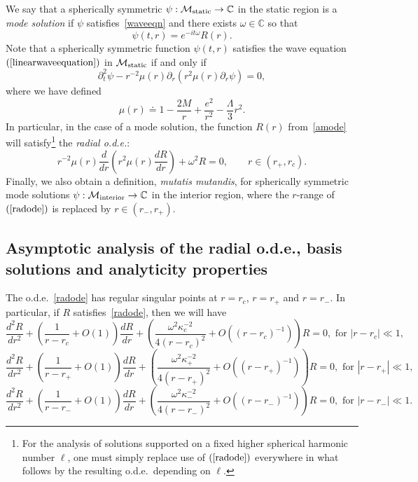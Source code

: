 \documentclass[A4,10pt]{article}
\begin{document}
We say that a spherically symmetric $\psi : \mathcal{M}_{{\rm static}} \to \mathbb{C}$ 
in the static region is a \emph{mode solution} if $\psi$ satisfies~\eqref{waveeqn} and there exists $\omega \in \mathbb{C}$ so that
\begin{equation}\label{amode}
\psi(t,r) = e^{-it\omega}R(r).
\end{equation}
Note that a spherically symmetric function $\psi(t,r)$ satisfies the wave equation $(\ref{linearwaveequation})$ in $\mathcal{M}_{{\rm static}}$ if and only if
\begin{equation}\label{waveeqn}
\partial_t^2\psi - r^{-2}\mu(r)\partial_r\left(r^2\mu(r)\partial_r\psi\right) = 0,
\end{equation}
where we have defined
\[\mu(r) \doteq 1-\frac{2M}{r} + \frac{e^2}{r^2} - \frac{\Lambda}{3}r^2.\]
In particular, in the case of a mode solution, the function $R(r)$ from~\eqref{amode} will satisfy\footnote{For the analysis of solutions supported
on a fixed higher spherical harmonic number $\ell$, 
one must simply replace use of $(\ref{radode})$ everywhere in what follows  by the resulting
o.d.e.~depending on $\ell$.} the \emph{radial o.d.e.}:
\begin{equation}\label{radode}
r^{-2}\mu(r)\frac{d}{dr}\left(r^2\mu(r)\frac{dR}{dr}\right) + \omega^2R = 0,\qquad r \in  (r_+,r_c).
\end{equation}
Finally, we also obtain a definition, \emph{mutatis mutandis}, for spherically symmetric mode solutions $\psi : \mathcal{M}_{{\rm interior}} \to \mathbb{C}$ in the interior region, 
where the $r$-range of $(\ref{radode})$
is replaced by $r\in (r_-,r_+)$. 

\subsection{Asymptotic analysis of the radial o.d.e., basis solutions and analyticity
properties}\label{asympanal}
The o.d.e.~\eqref{radode} has regular singular points at $r = r_c$, $r = r_+$ and $r = r_-$. In particular, if $R$ satisfies~\eqref{radode}, then we will have 
\begin{equation}\label{nearrc}
\frac{d^2R}{dr^2} + \left(\frac{1}{r-r_c} + O\left(1\right)\right)\frac{dR}{dr} + \left(\frac{\omega^2\kappa_c^{-2}}{4(r-r_c)^2} + O\left((r-r_c)^{-1}\right)\right)R = 0,\text{ for }|r-r_c| \ll 1,
\end{equation}
\begin{equation}\label{nearrplus}
\frac{d^2R}{dr^2} + \left(\frac{1}{r-r_+} + O\left(1\right)\right)\frac{dR}{dr} + \left(\frac{\omega^2\kappa_+^{-2}}{4(r-r_+)^2} + O\left((r-r_+)^{-1}\right)\right)R = 0,\text{ for }|r-r_+| \ll 1,
\end{equation}
\begin{equation}\label{nearrminus}
\frac{d^2R}{dr^2} + \left(\frac{1}{r-r_-} + O\left(1\right)\right)\frac{dR}{dr} + \left(\frac{\omega^2\kappa_-^{-2}}{4(r-r_-)^2} + O\left((r-r_-)^{-1}\right)\right)R = 0,\text{ for }|r-r_-| \ll 1.
\end{equation}
\end{document}
